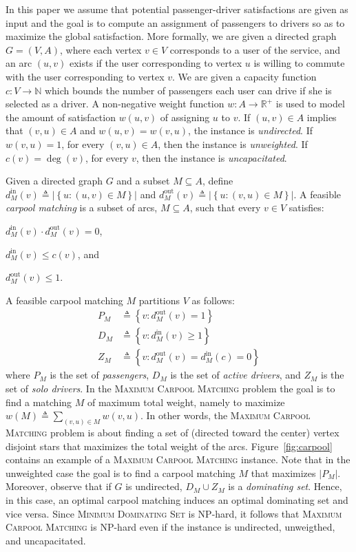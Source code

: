 \documentclass[11pt]{article}
\newcommand{\set}[1]{\left\{ #1 \right\}}
\newcommand{\abs}[1]{\left| #1 \right|}
\newcommand{\eqdf}{\triangleq}
\def\R{\mathbb{R}}
\def\N{\mathbb{N}}
\newcommand{\din}[1][M]{d^{\text{in}}_{#1}}
\newcommand{\dout}[1][M]{d^{\text{out}}_{#1}}
\newcommand{\carpool}{\textsc{Maximum Carpool Matching}\xspace}
\begin{document}
In this paper we assume that potential passenger-driver satisfactions
are given as input and the goal is to compute an assignment of
passengers to drivers so as to maximize the global satisfaction.
%
More formally, we are given a directed graph $G = (V, A)$, where each
vertex $v \in V$ corresponds to a user of the service, and an arc $(u,
v)$ exists if the user corresponding to vertex $u$ is willing to
commute with the user corresponding to vertex $v$.  We are given a
capacity function $c: V \rightarrow \N$ which bounds the number of
passengers each user can drive if she is selected as a driver.  A
non-negative weight function $w : A \rightarrow \R^+$ is used to model
the amount of satisfaction $w(u,v)$ of assigning $u$ to $v$.
%
If $(u,v) \in A$ implies that $(v,u) \in A$ and $w(u,v) = w(v,u)$, the
instance is \emph{undirected}.  If $w(v,u) = 1$, for every $(v,u) \in
A$, then the instance is \emph{unweighted}.  If $c(v) = \deg(v)$, for
every $v$, then the instance is \emph{uncapacitated}.

Given a directed graph $G$ and a subset $M \subseteq A$, define
\(
\din[M](v) \eqdf \abs{\set{u :(u,v) \in M}}
\)
and
\(
\dout[M](v) \eqdf \abs{\set{u :(v,u) \in M}}
\).
%
A feasible \emph{carpool matching} is a subset of arcs, $M \subseteq
A$, such that every $v \in V$ satisfies:%
\begin{inparaenum}[(i)]
\item $\din[M](v) \cdot \dout[M](v) = 0$,
\item $\din[M](v) \leq c(v)$, and 
\item $\dout[M](v) \leq 1$.
\end{inparaenum}
A feasible carpool matching $M$ partitions $V$ as follows:
\begin{align*}
P_M & \eqdf \set{v : \dout[M](v) = 1} \\
D_M & \eqdf \set{v : \din[M](v) \geq 1} \\
Z_M & \eqdf \set{v : \dout[M](v) = \din[M](c) = 0}
\end{align*}
where $P_M$ is the set of \emph{passengers}, $D_M$ is the set of
\emph{active drivers}, and $Z_M$ is the set of \emph{solo drivers}.
%
In the \carpool problem the goal is to find a matching $M$ of maximum
total weight, namely to maximize $w(M) \eqdf \sum_{(v,u) \in M}
w(v,u)$.  In other words, the \carpool problem is about finding a set
of (directed toward the center) vertex disjoint stars that maximizes
the total weight of the arcs.  
%
Figure~\ref{fig:carpool} contains an example of a \carpool instance.
%
Note that in the unweighted case the goal is to find a carpool
matching $M$ that maximizes $\abs{P_M}$.
%
Moreover, observe that if $G$ is undirected, $D_M \cup Z_M$ is
a \emph{dominating set}.  Hence, in this case, an optimal carpool
matching induces an optimal dominating set and vice versa.
Since \textsc{Minimum Dominating Set} is NP-hard, it follows
that \carpool is NP-hard even if the instance is undirected,
unweigthed, and uncapacitated.
\end{document}
